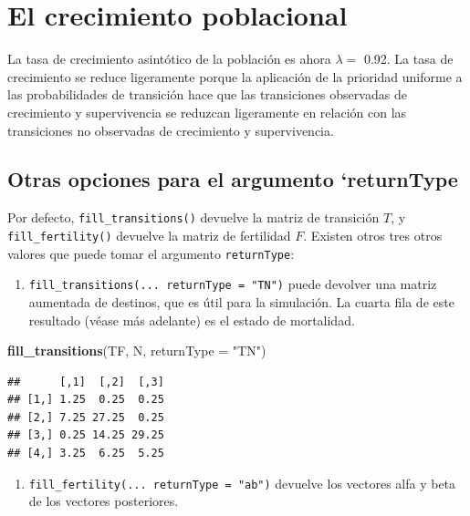 \documentclass[
]{book}
\newenvironment{Shaded}{\begin{snugshade}}{\end{snugshade}}
\newcommand{\AttributeTok}[1]{\textcolor[rgb]{0.13,0.29,0.53}{#1}}
\newcommand{\FunctionTok}[1]{\textcolor[rgb]{0.13,0.29,0.53}{\textbf{#1}}}
\newcommand{\NormalTok}[1]{#1}
\newcommand{\StringTok}[1]{\textcolor[rgb]{0.31,0.60,0.02}{#1}}
\providecommand{\tightlist}{%
  \setlength{\itemsep}{0pt}\setlength{\parskip}{0pt}}
\theoremstyle{definition}
\theoremstyle{definition}
\theoremstyle{definition}
\theoremstyle{definition}
\theoremstyle{remark}
\begin{document}
\hypertarget{el-crecimiento-poblacional}{%
\section{El crecimiento poblacional}\label{el-crecimiento-poblacional}}

La tasa de crecimiento asintótico de la población es ahora \(\lambda =\)
0.92. La tasa de crecimiento
se reduce ligeramente porque la aplicación de la prioridad uniforme a
las probabilidades de transición hace que las transiciones observadas de
crecimiento y supervivencia se reduzcan ligeramente en relación con las
transiciones no observadas de crecimiento y supervivencia.

\hypertarget{otras-opciones-para-el-argumento-returntype}{%
\subsection{Otras opciones para el argumento `returnType}\label{otras-opciones-para-el-argumento-returntype}}

Por defecto, \texttt{fill\_transitions()} devuelve la matriz de transición \(T\),
y \texttt{fill\_fertility()} devuelve la matriz de fertilidad \(F\). Existen otros
tres otros valores que puede tomar el argumento \texttt{returnType}:

\begin{enumerate}
\def\labelenumi{\arabic{enumi}.}
\tightlist
\item
  \texttt{fill\_transitions(...\ returnType\ =\ "TN")} puede devolver una matriz
  aumentada de destinos, que es útil para la simulación. La cuarta
  fila de este resultado (véase más adelante) es el estado de
  mortalidad.
\end{enumerate}

\begin{Shaded}
\begin{Highlighting}[]
\FunctionTok{fill\_transitions}\NormalTok{(TF, N, }\AttributeTok{returnType =} \StringTok{"TN"}\NormalTok{)}
\end{Highlighting}
\end{Shaded}

\begin{verbatim}
##      [,1]  [,2]  [,3]
## [1,] 1.25  0.25  0.25
## [2,] 7.25 27.25  0.25
## [3,] 0.25 14.25 29.25
## [4,] 3.25  6.25  5.25
\end{verbatim}

\begin{enumerate}
\def\labelenumi{\arabic{enumi}.}
\setcounter{enumi}{1}
\tightlist
\item
  \texttt{fill\_fertility(...\ returnType\ =\ "ab")} devuelve los vectores alfa y
  beta de los vectores posteriores.\\
\end{enumerate}
\end{document}
